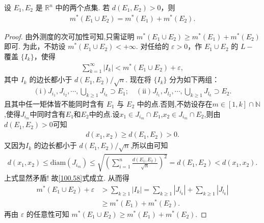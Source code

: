 \documentclass[../../main.tex]{subfiles}
\begin{document}
\begin{theorem}\label{theorem:距离大于零的两个点集的外测度满足可数可加性}
设 \(E_1, E_2\) 是 \(\mathbb{R}^n\) 中的两个点集. 若 \(d(E_1, E_2)>0\)，则
\begin{align*}
m^*(E_1 \cup E_2) = m^*(E_1) + m^*(E_2).
\end{align*}
\end{theorem}
\begin{proof}
由外测度的次可加性可知,只需证明 \(m^*(E_1 \cup E_2) \geq m^*(E_1) + m^*(E_2)\) 即可. 为此，不妨设 \(m^*(E_1 \cup E_2)< + \infty\). 对任给的 \(\varepsilon > 0\)，作 \(E_1 \cup E_2\) 的 \(L -\)覆盖 \(\{I_k\}\)，使得
\begin{align*}
\sum_{k = 1}^{\infty} |I_k| < m^*(E_1 \cup E_2) + \varepsilon,
\end{align*}
其中 \(I_k\) 的边长都小于 \(d(E_1, E_2)/\sqrt{n}\). 现在将 \(\{I_k\}\) 分为如下两组：
\begin{align}
(\text{i})J_{i_1}, J_{i_2}, \cdots,\bigcup_{k \geq 1} J_{i_k} \supset E_1 ; \quad (\text{ii})J_{l_1}, J_{l_2}, \cdots,\bigcup_{k \geq 1} J_{l_k} \supset E_2.\label{100.58}
\end{align}
且其中任一矩体皆不能同时含有 \(E_1\) 与 \(E_2\) 中的点.否则,不妨设存在$m\in [1,k]\cap \mathbb{N}$,使得$J_{i_m}$中同时含有$E_1$和$E_2$中的点.设$x_1\in J_{i_m}\cap E_1$,$x_2\in J_{i_m}\cap E_2$,则由$d(E_1,E_2)>0$可知
\begin{align*}
d(x_1,x_2) \geqslant d(E_1,E_2) > 0.
\end{align*}
又因为\(I_k\) 的边长都小于 \(d(E_1, E_2)/\sqrt{n}\),所以由可知
\begin{align*}
d(x_1,x_2)\leqslant \mathrm{diam}\left( J_{i_m} \right) \leqslant \sqrt{\left( \sum_{i=1}^n{\frac{d\left( E_1,E_2 \right)}{\sqrt{n}}} \right) ^2}=d(E_1,E_2)<d(x_1,x_2).
\end{align*}
上式显然矛盾!
故\eqref{100.58}式成立.
从而得
\begin{align*}
m^*(E_1 \cup E_2) + \varepsilon &> \sum_{k \geq 1} |I_k| = \sum_{k \geq 1} |J_{i_k}| + \sum_{k \geq 1} |J_{l_k}| \\
&\geq m^*(E_1) + m^*(E_2).
\end{align*}
再由 \(\varepsilon\) 的任意性可知 \(m^*(E_1 \cup E_2) \geq m^*(E_1) + m^*(E_2)\). 
\end{proof}
\end{document}
